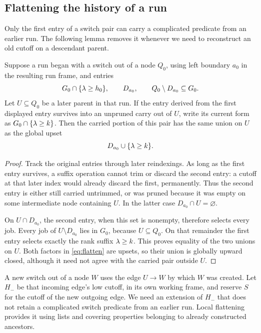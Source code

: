 \subsection{Flattening the history of a run}

Only the first entry of a switch pair can carry a complicated predicate
from an earlier run. The following lemma removes it whenever we need
to reconstruct an old cutoff on a descendant parent.

\begin{lemma}\label{lem:flatten}
Suppose a run began with a switch out of a node \(Q_0\), using
left boundary \(a_0\) in the resulting run frame, and entries
\[
 G_0\cap\{\lambda\ge h_0\},\qquad D_{a_0},
 \qquad Q_0\setminus D_{a_0}\subseteq G_0 .
\]
Let \(U\subseteq Q_0\) be a later parent in that run. If the entry derived from the first displayed entry
survives into an unpruned carry out of \(U\), write its
current form as \(G_0\cap\{\lambda\ge k\}\). Then the carried portion
of this pair has the same union on \(U\) as the global upset
\begin{equation}
 D_{a_0}\cup\{\lambda\ge k\}.
 \label{eq:flatten}
\end{equation}
\end{lemma}
\begin{proof}
Track the original entries through later reindexings.
As long as the first entry survives, a suffix operation cannot
trim or discard the second entry: a cutoff at that later index
would already discard the first, permanently.
Thus the second entry is either still carried untrimmed, or was
pruned because it was empty on some intermediate node containing
\(U\). In the latter case \(D_{a_0}\cap U=\varnothing\).

On \(U\cap D_{a_0}\), the second entry, when this set is nonempty,
therefore selects every job. Every job of
\(U\setminus D_{a_0}\) lies in \(G_0\), because \(U\subseteq Q_0\).
On that remainder the first entry selects exactly the rank suffix
\(\lambda\ge k\). This proves equality of the two unions on \(U\).
Both factors in \eqref{eq:flatten} are upsets, so their union is
globally upward closed, although it need not agree with the
carried pair outside \(U\).
\end{proof}

A new switch out of a node \(W\) uses the edge \(U\to W\)
by which \(W\) was created. Let \(H_-\) be that incoming
edge's low cutoff, in its own working frame, and reserve \(S\)
for the cutoff of the new outgoing edge. We need an extension
of \(H_-\) that does not retain a complicated switch predicate
from an earlier run. Local flattening provides it using lists and
covering properties belonging to already constructed ancestors.

